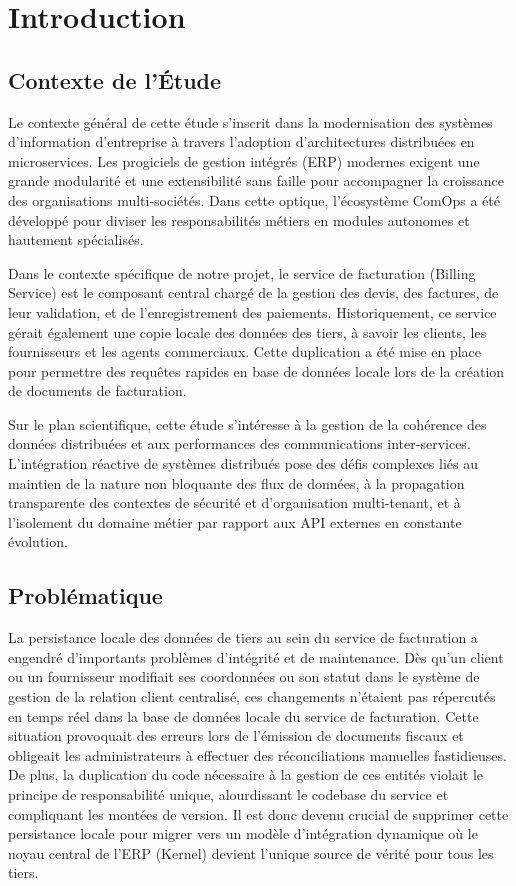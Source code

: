 \chapter*{Introduction}

\section*{Contexte de l'Étude}
Le contexte général de cette étude s'inscrit dans la modernisation des systèmes d'information d'entreprise à travers l'adoption d'architectures distribuées en microservices. Les progiciels de gestion intégrés (ERP) modernes exigent une grande modularité et une extensibilité sans faille pour accompagner la croissance des organisations multi-sociétés. Dans cette optique, l'écosystème ComOps a été développé pour diviser les responsabilités métiers en modules autonomes et hautement spécialisés.

Dans le contexte spécifique de notre projet, le service de facturation (Billing Service) est le composant central chargé de la gestion des devis, des factures, de leur validation, et de l'enregistrement des paiements. Historiquement, ce service gérait également une copie locale des données des tiers, à savoir les clients, les fournisseurs et les agents commerciaux. Cette duplication a été mise en place pour permettre des requêtes rapides en base de données locale lors de la création de documents de facturation.

Sur le plan scientifique, cette étude s'intéresse à la gestion de la cohérence des données distribuées et aux performances des communications inter-services. L'intégration réactive de systèmes distribués pose des défis complexes liés au maintien de la nature non bloquante des flux de données, à la propagation transparente des contextes de sécurité et d'organisation multi-tenant, et à l'isolement du domaine métier par rapport aux API externes en constante évolution.

\section*{Problématique}
La persistance locale des données de tiers au sein du service de facturation a engendré d'importants problèmes d'intégrité et de maintenance. Dès qu'un client ou un fournisseur modifiait ses coordonnées ou son statut dans le système de gestion de la relation client centralisé, ces changements n'étaient pas répercutés en temps réel dans la base de données locale du service de facturation. Cette situation provoquait des erreurs lors de l'émission de documents fiscaux et obligeait les administrateurs à effectuer des réconciliations manuelles fastidieuses. De plus, la duplication du code nécessaire à la gestion de ces entités violait le principe de responsabilité unique, alourdissant le codebase du service et compliquant les montées de version. Il est donc devenu crucial de supprimer cette persistance locale pour migrer vers un modèle d'intégration dynamique où le noyau central de l'ERP (Kernel) devient l'unique source de vérité pour tous les tiers.

